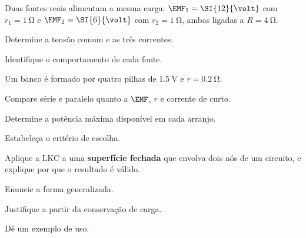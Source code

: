 \blocoaprofundamento
\begin{questao}[3]{}

Duas fontes reais alimentam a mesma carga: $\EMF_1=\SI{12}{\volt}$ com
$r_1=\SI{1}{\ohm}$ e $\EMF_2=\SI{6}{\volt}$ com $r_2=\SI{1}{\ohm}$, ambas
ligadas a $R=\SI{4}{\ohm}$.
\begin{itensq}
\item Determine a tensão comum e as três correntes.
\item Identifique o comportamento de cada fonte.
\end{itensq}


\end{questao}
\begin{questao}[3]{}

Um banco é formado por quatro pilhas de $\SI{1.5}{\volt}$ e
$r=\SI{0.2}{\ohm}$.
\begin{itensq}
\item Compare série e paralelo quanto a $\EMF$, $r$ e corrente de
      curto.
\item Determine a potência máxima disponível em cada arranjo.
\item Estabeleça o critério de escolha.
\end{itensq}


\end{questao}
\begin{questao}[3]{}

Aplique a LKC a uma \textbf{superfície fechada} que envolva dois nós de um
circuito, e explique por que o resultado é válido.
\begin{itensq}
\item Enuncie a forma generalizada.
\item Justifique a partir da conservação de carga.
\item Dê um exemplo de uso.
\end{itensq}


\end{questao}
